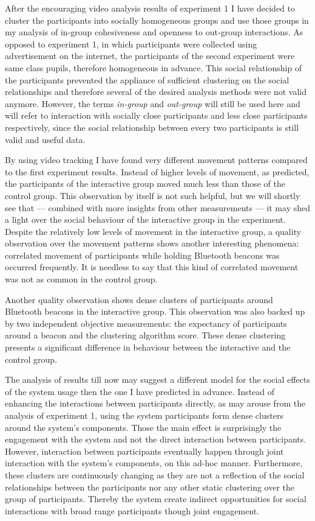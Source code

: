 \documentclass[a4paper,11pt]{article}
\newcommand{\definition}[1]{\emph{#1}}
\begin{document}
After the encouraging video analysis results of experiment 1 I have decided to cluster the participants into socially homogeneous groups and use those groups in my analysis of in-group cohesiveness and openness to out-group interactions.
As opposed to experiment 1, in which participants were collected using advertisement on the internet, the participants of the second experiment were same class pupils, therefore homogeneous in advance.
This social relationship of the participants prevented the appliance of sufficient clustering on the social relationships and therefore several of the desired analysis methods were not valid anymore.
However, the terms \definition{in-group} and \definition{out-group} will still be used here and will refer to interaction with socially close participants and less close participants respectively, since the social relationship between every two participants is still valid and useful data.

By using video tracking I have found very different movement patterns compared to the first experiment results.
Instead of higher levels of movement, as predicted, the participants of the interactive group moved much less than those of the control group.
This observation by itself is not such helpful, but we will shortly see that --- combined with more insights from other measurements --- it may shed a light over the social behaviour of the interactive group in the experiment.
Despite the relatively low levels of movement in the interactive group, a quality observation over the movement patterns shows another interesting phenomena: correlated movement of participants while holding Bluetooth beacons was occurred frequently.
It is needless to say that this kind of correlated movement was not as common in the control group.

Another quality observation shows dense clusters of participants around Bluetooth beacons in the interactive group.
This observation was also backed up by two independent objective measurements: the expectancy of participants around a beacon and the clustering algorithm score.
These dense clustering presents a significant difference in behaviour between the interactive and the control group.

The analysis of results till now may suggest a different model for the social effects of the system usage then the one I have predicted in advance.
Instead of enhancing the interactions between participants directly, as may arouse from the analysis of experiment 1, using the system participants form dense clusters around the system's components.
Those the main effect is surprisingly the engagement with the system and not the direct interaction between participants.
However, interaction between participants eventually happen through joint interaction with the system's components, on this ad-hoc manner.
Furthermore, these clusters are continuously changing as they are not a reflection of the social relationships between the participants nor any other static clustering over the group of participants.
Thereby the system create indirect opportunities for social interactions with broad range participants though joint engagement.
\end{document}
